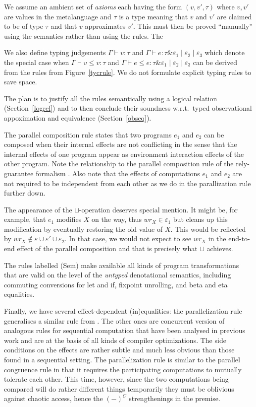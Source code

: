 \documentclass[nocopyrightspace,preprint]{sigplanconf}
\newcommand{\eff}{\varepsilon}
\newcommand{\wEff}[1]{\ensuremath{\mathit{wr}_{#1}}}
\newcommand{\cloc}{\ensuremath{X}\xspace}
\newcommand{\myety}[4]{{#1}\mathrel{\&}{#2} \mid #3 \mid #4}
\begin{document}
We assume an ambient set of \emph{axioms} each having the form
$(v,v',\tau)$ where $v, v'$ are values in the metalanguage and $\tau$
is a type meaning that $v$ and $v'$ are claimed to be of type $\tau$
and that $v$ approximates $v'$. This must then be proved ``manually''
using the semantics rather than using the rules. The

We also define typing judgements $\Gamma\vdash v:\tau$ and
$\Gamma\vdash e:\myety{\tau}{\eff_1}{\eff_2}{\eff_3}$ which denote the
special case when $\Gamma\vdash v\leq v:\tau$ and $\Gamma\vdash e\leq
e:\myety{\tau}{\eff_1}{\eff_2}{\eff_3}$ can be derived from the rules
from Figure~\ref{tycrule}. We do not formulate explicit typing rules
to save space.

The plan is to justify all the rules semantically using a logical relation (Section~\ref{logrel}) and to then conclude their soundness w.r.t.\ typed observational appoximation and equivalence (Section~\ref{obseq}). 

The parallel composition rule states that two programs $e_1$ and $e_2$
can be composed when their internal effects are not conflicting in the
sense that the internal effects of one program appear as environment
interaction effects of the other program. Note the relationship to the
parallel composition rule of the rely-guarantee formalism
\cite{DBLP:journals/logcom/ColemanJ07}. Also note that the effects of
computations $e_1$ and $e_2$ are not required to be independent from
each other as we do in the parallization rule further down.

 The appearance of the
$\sqcup$-operation deserves special mention. It might be, for example,
that $e_1$ modifies $\cloc$ on the way, thus $\wEff{\cloc}\in\eff_1$
but cleans up this modification by eventually restoring the old value
of $\cloc$. This would be reflected by
$\wEff{\cloc}\notin\eff\cup\eff'\cup\eff_2$. In that case, we would
not expect to see $\wEff{\cloc}$ in the end-to-end effect of the
parallel composition and that is precisely what $\sqcup$ achieves.

The rules labelled (Sem) make available all kinds of program
transformations that are valid on the level of the \emph{untyped}
denotational semantics, including commuting conversions for let and
if, fixpoint unrolling, and beta and eta equalities. 

Finally, we have several effect-dependent (in)equalities: the
parallelization rule generalises a similar rule from
\cite{birkedal}. The other ones are concurrent version of analogous
rules for sequential computation that have been analysed in previous
work
\cite{DBLP:conf/aplas/BentonKHB06,benton07ppdp,DBLP:conf/icfp/ThamsborgB11,DBLP:dblp_conf/popl/Benton0N14}
and are at the basis of all kinds of compiler optimizations.  The side
conditions on the effects are rather subtle and much less obvious than
those found in a sequential setting. The parallelization rule is similar to the parallel congruence rule in that it requires the participating computations to mutually tolerate each other. This time, however, since the two computations being compared will do rather different things temporarily they must be oblivious against chaotic access, hence the $(-)^C$ strengthenings in the premise. 
\end{document}
